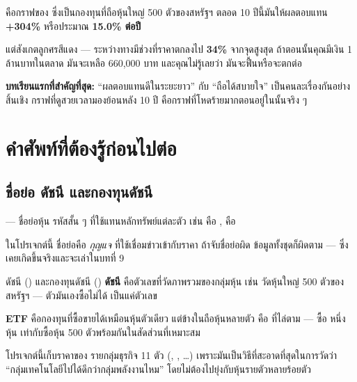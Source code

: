 \documentclass[11pt]{article}
\begin{document}
 คือกราฟของ  ซึ่งเป็นกองทุนที่ถือหุ้นใหญ่ 500 ตัวของสหรัฐฯ
ตลอด 10 ปีนี้มันให้ผลตอบแทน \textbf{+304\%} หรือประมาณ \textbf{15.0\% ต่อปี}

แต่สังเกตลูกศรสีแดง --- ระหว่างทางมีช่วงที่ราคาตกลงไป \textbf{34\%} จากจุดสูงสุด
ถ้าตอนนั้นคุณมีเงิน 1 ล้านบาทในตลาด มันจะเหลือ 660,000 บาท และคุณไม่รู้เลยว่า
มันจะฟื้นหรือจะตกต่อ

\begin{keypoint}
\textbf{บทเรียนแรกที่สำคัญที่สุด:} ``ผลตอบแทนดีในระยะยาว'' กับ ``ถือได้สบายใจ''
เป็นคนละเรื่องกันอย่างสิ้นเชิง กราฟที่ดูสวยเวลามองย้อนหลัง 10 ปี
คือกราฟที่โหดร้ายมากตอนอยู่ในนั้นจริง ๆ
\end{keypoint}

\section{คำศัพท์ที่ต้องรู้ก่อนไปต่อ}

\subsection{ชื่อย่อ ดัชนี และกองทุนดัชนี}

\begin{term}{ --- ชื่อย่อหุ้น}
รหัสสั้น ๆ ที่ใช้แทนหลักทรัพย์แต่ละตัว เช่น  คือ ,
 คือ 

ในโปรเจกต์นี้ ชื่อย่อคือ \emph{กุญแจ} ที่ใช้เชื่อมข่าวเข้ากับราคา
ถ้าจับชื่อย่อผิด ข้อมูลทั้งชุดก็ผิดตาม --- ซึ่งเคยเกิดขึ้นจริงและจะเล่าในบทที่ 9
\end{term}

\begin{term}{ดัชนี () และกองทุนดัชนี ()}
\textbf{ดัชนี} คือตัวเลขที่วัดภาพรวมของกลุ่มหุ้น เช่น 
วัดหุ้นใหญ่ 500 ตัวของสหรัฐฯ --- ตัวมันเองซื้อไม่ได้ เป็นแค่ตัวเลข

\textbf{ETF} คือกองทุนที่ซื้อขายได้เหมือนหุ้นตัวเดียว แต่ข้างในถือหุ้นหลายตัว
 คือ  ที่ไล่ตาม  --- ซื้อ  หนึ่งหุ้น
เท่ากับซื้อหุ้น 500 ตัวพร้อมกันในสัดส่วนที่เหมาะสม
\end{term}

โปรเจกต์นี้เก็บราคาของ  รายกลุ่มธุรกิจ 11 ตัว (, ,  \ldots)
เพราะมันเป็นวิธีที่สะอาดที่สุดในการวัดว่า ``กลุ่มเทคโนโลยีไปได้ดีกว่ากลุ่มพลังงานไหม''
โดยไม่ต้องไปยุ่งกับหุ้นรายตัวหลายร้อยตัว
\end{document}
